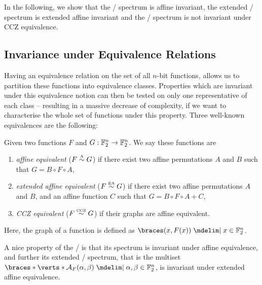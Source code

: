 In the following, we show that the \ACT/ spectrum is affine invariant, the extended \ACT/ spectrum is extended affine invariant and the \ACT/ spectrum is not invariant under CCZ equivalence.

\subsection{Invariance under Equivalence Relations}%
\label{act:sec:invariance}

Having an equivalence relation on the set of all $n$-bit functions, allows us to partition these functions into equivalence classes.
Properties which are invariant under this equivalence notion can then be tested on only one representative of each class -- resulting in a massive decrease of complexity, if we want to characterise the whole set of functions under this property.
Three well-known equivalences are the following:
\begin{definition}
    Given two functions $F$ and $G : \mathbb{F}_2^n \to \mathbb{F}_2^n$.
    We say these functions are
    \begin{enumerate}
        \item \emph{affine equivalent} ($F \stackrel{\text{\tiny A}}{\sim} G$) if there exist two affine permutations $A$ and $B$ such that $G = B \circ F \circ A$,
        \item \emph{extended affine equivalent} ($F \stackrel{\text{\tiny EA}}{\sim} G$) if there exist two affine permutations $A$ and $B$, and an affine function $C$ such that $G = B \circ F \circ A + C$,
        \item \emph{CCZ equivalent} ($F \stackrel{\text{\tiny CCZ}}{\sim} G$) if their graphs are affine equivalent.
    \end{enumerate}
    Here, the graph of a function is defined as $\set{(x, F(x)) \given x \in \F_2^n}$.
\end{definition}

A nice property of the \ACT/ is that its spectrum is invariant under affine equivalence, and further its extended \ACT/ spectrum, that is the multiset $\set*{\abs*{\AC{F}(\alpha, \beta)} \given \alpha, \beta \in \F_2^n}$, is invariant under extended affine equivalence.

